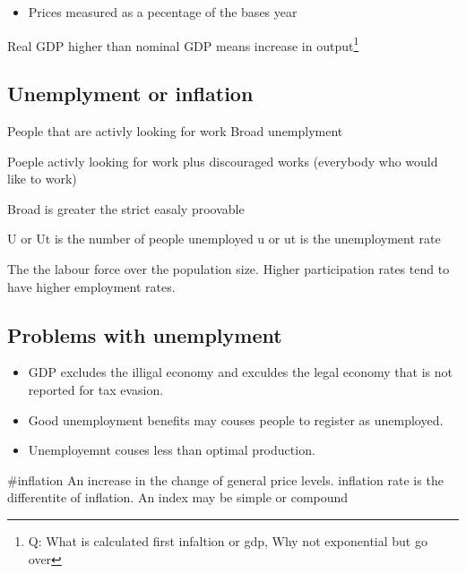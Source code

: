 \documentclass[twocolumn]{article}
\providecommand{\tightlist}{%
  \setlength{\itemsep}{0pt}\setlength{\parskip}{0pt}}
\begin{document}
\begin{itemize}
\tightlist
\item
  Prices measured as a pecentage of the bases year
\end{itemize}

Real GDP higher than nominal GDP means increase in output\footnote{Q:
  What is calculated first infaltion or gdp, Why not exponential but go
  over}

\hypertarget{unemplyment-or-inflation}{%
\subsection{Unemplyment or inflation}\label{unemplyment-or-inflation}}

\begin{description}
\tightlist
\item[Strict unemployment]
People that are activly looking for work Broad unemplyment

Poeple activly looking for work plus discouraged works (everybody who
would like to work)
\end{description}

Broad is greater the strict easaly proovable

U or Ut is the number of people unemployed u or ut is the unemployment
rate

\begin{description}
\tightlist
\item[Paticipation rate]
The the labour force over the population size. Higher participation
rates tend to have higher employment rates.
\end{description}

\hypertarget{problems-with-unemplyment}{%
\subsection{Problems with unemplyment}\label{problems-with-unemplyment}}

\begin{itemize}
\tightlist
\item
  GDP excludes the illigal economy and exculdes the legal economy that
  is not reported for tax evasion.
\item
  Good unemployment benefits may couses people to register as
  unemployed.
\item
  Unemployemnt couses less than optimal production.
\end{itemize}

\#inflation An increase in the change of general price levels. inflation
rate is the differentite of inflation. An index may be simple or
compound
\end{document}

